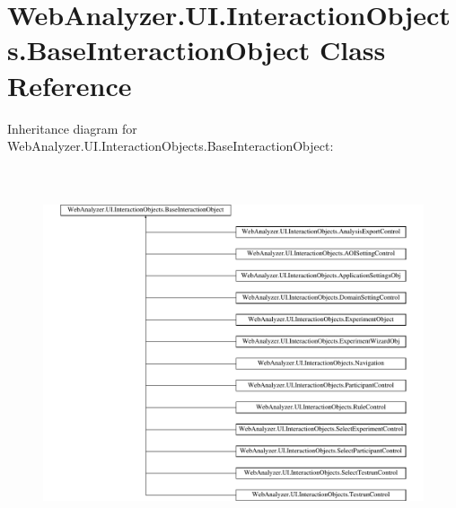 \hypertarget{class_web_analyzer_1_1_u_i_1_1_interaction_objects_1_1_base_interaction_object}{}\section{Web\+Analyzer.\+U\+I.\+Interaction\+Objects.\+Base\+Interaction\+Object Class Reference}
\label{class_web_analyzer_1_1_u_i_1_1_interaction_objects_1_1_base_interaction_object}
Inheritance diagram for Web\+Analyzer.\+U\+I.\+Interaction\+Objects.\+Base\+Interaction\+Object\+:\begin{figure}[H]
\begin{center}
\leavevmode
\includegraphics[height=10.919220cm]{class_web_analyzer_1_1_u_i_1_1_interaction_objects_1_1_base_interaction_object}
\end{center}
\end{figure}
